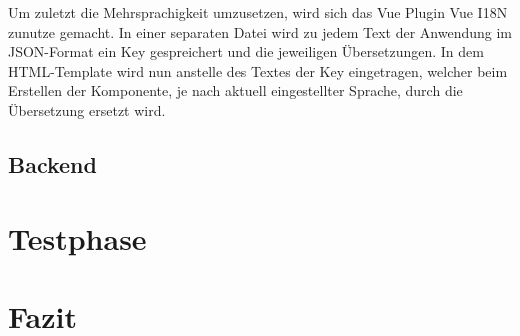 \documentclass[12pt]{article}
\begin{document}
Um zuletzt die Mehrsprachigkeit umzusetzen, wird sich das Vue Plugin Vue I18N zunutze gemacht.
In einer separaten Datei wird zu jedem Text der Anwendung im JSON-Format ein Key gespreichert und
die jeweiligen Übersetzungen. In dem HTML-Template wird nun anstelle des Textes der Key eingetragen,
welcher beim Erstellen der Komponente, je nach aktuell eingestellter Sprache, durch die Übersetzung
ersetzt wird.



\subsection{Backend}




%
%

\section{Testphase}



%
%

\section{Fazit}
\end{document}
